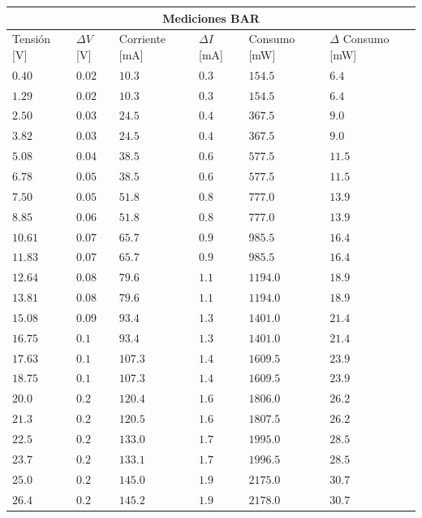 \documentclass[12pt,a4paper]{article}
\begin{document}
			\begin{center}
			{\footnotesize \begin{tabular}{ |l|l|l|l|l|l| }

			\hline
				\multicolumn{6}{|c|}{\textbf{Mediciones BAR}}\\ \hline
				Tensión [V] & $\Delta V$ [V] & Corriente [mA] & $\Delta I$ [mA] & Consumo [mW] & $\Delta$ Consumo [mW]\\ \hline
				$0.40$  & $0.02$ & $ 10.3 $ &  $ 0.3 $ & $ 154.5$   & $ 6.4 $ \\ \hline
				$1.29$  & $0.02$ & $ 10.3$ &   $ 0.3 $ & $ 154.5$  & $ 6.4 $ \\ \hline
				$2.50$  & $0.03$ & $ 24.5 $ &  $ 0.4 $ & $ 367.5 $  & $ 9.0 $ \\ \hline
				$3.82$  & $0.03$ & $ 24.5 $ &  $ 0.4 $ & $ 367.5$  & $ 9.0 $ \\ \hline
				$5.08$  & $0.04$ & $ 38.5 $ &  $ 0.6 $ & $ 577.5 $ & $ 11.5 $ \\ \hline
				$6.78$  & $0.05$ & $ 38.5 $ &  $ 0.6 $ & $ 577.5 $ & $ 11.5$ \\ \hline
				$7.50$  & $0.05$ & $ 51.8 $ &  $ 0.8 $ & $ 777.0 $ & $ 13.9 $ \\ \hline
				$8.85$  & $0.06$ & $ 51.8 $ &  $ 0.8 $ & $ 777.0 $ & $ 13.9 $ \\ \hline
				$10.61$ & $0.07$ & $ 65.7 $ &  $ 0.9 $ & $ 985.5 $ & $ 16.4 $ \\ \hline
				$11.83$ & $0.07$ & $ 65.7 $ &  $ 0.9 $ & $ 985.5 $ & $ 16.4 $ \\ \hline
				$12.64$ & $0.08$ & $ 79.6 $ &  $ 1.1 $ & $ 1194.0 $ & $ 18.9 $ \\ \hline
				$13.81$ & $0.08$ & $ 79.6 $ &  $ 1.1 $ & $ 1194.0 $ & $ 18.9 $ \\ \hline
				$15.08$ & $0.09$ & $ 93.4$ &   $ 1.3 $ & $ 1401.0$ & $ 21.4 $ \\ \hline
				$16.75$ & $0.1$  & $ 93.4 $ &  $ 1.3 $ & $ 1401.0 $ & $ 21.4 $ \\ \hline
				$17.63$ & $0.1$  & $ 107.3 $ & $ 1.4 $ & $ 1609.5 $ & $ 23.9 $ \\ \hline
				$18.75$ & $0.1$  & $ 107.3 $ & $ 1.4 $ & $ 1609.5 $ & $ 23.9 $ \\ \hline
				$20.0$  & $0.2$  & $ 120.4 $ & $ 1.6 $ & $ 1806.0 $ & $ 26.2 $ \\ \hline
				$21.3$  & $0.2$  & $ 120.5 $ & $ 1.6 $ & $ 1807.5 $ & $ 26.2 $ \\ \hline
				$22.5$  & $0.2$  & $ 133.0 $ & $ 1.7 $ & $ 1995.0 $ & $ 28.5 $ \\ \hline
				$23.7$  & $0.2$  & $ 133.1 $ & $ 1.7 $ & $ 1996.5 $ & $ 28.5 $ \\ \hline
				$25.0$  & $0.2$  & $ 145.0 $ & $ 1.9 $ & $ 2175.0 $ & $ 30.7 $ \\ \hline
				$26.4$  & $0.2$  & $ 145.2 $ & $ 1.9 $ & $ 2178.0 $ & $ 30.7 $ \\ \hline
 				
				
			\end{tabular}}\label{tab:consumobar}
			\end{center}
\end{document}
